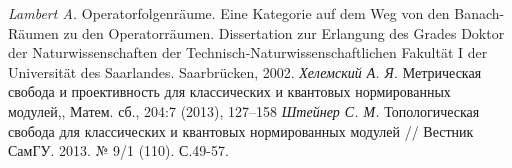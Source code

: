 \documentclass[12pt]{article}
\begin{document}
\begin{thebibliography}{99}
\textit{Lambert A.} Operatorfolgenr\"{a}ume. Eine Kategorie auf dem Weg von den Banach-R\"{a}umen zu den Operatorr\"{a}umen. Dissertation zur Erlangung des Grades Doktor der Naturwissenschaften der Technisch-Naturwissenschaftlichen Fakult\"{a}t I der Universit\"{a}t des Saarlandes. Saarbr\"{u}cken, 2002.
\textit{Хелемский А. Я.} Метрическая свобода и проективность для классических и квантовых нормированных модулей,, Матем. сб., 204:7 (2013), 127–158 
\textit{Штейнер С. М.} 
Топологическая свобода для классических и квантовых нормированных модулей // Вестник СамГУ. 2013. № 9/1 (110). С.49-57.
\end{thebibliography}
\end{document}
